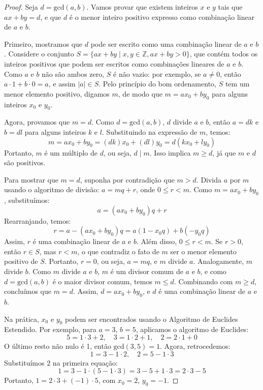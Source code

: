\begin{proof}
  Seja $d = \text{gcd}(a, b)$. Vamos provar que existem inteiros $x$ e $y$ tais
  que $ax + by = d$, e que $d$ é o menor inteiro positivo expresso como
  combinação linear de $a$ e $b$.

  Primeiro, mostramos que $d$ pode ser escrito como uma combinação linear de
  $a$ e $b$. Considere o conjunto $S = \{ ax + by \mid x, y \in \mathbb{Z}, ax + by > 0 \}$,
  que contém todos os inteiros positivos que podem ser escritos
  como combinações lineares de $a$ e $b$. Como $a$ e $b$ não são ambos zero,
  $S$ é não vazio: por exemplo, se $a \neq 0$, então $a \cdot 1 + b \cdot 0 = a$,
  e assim $|a| \in S$. Pelo princípio do bom
  ordenamento, $S$ tem um menor elemento positivo, digamos $m$, de modo que $m
  = ax_0 + by_0$ para alguns inteiros $x_0$ e $y_0$.

  Agora, provamos que $m = d$. Como $d = \text{gcd}(a, b)$, $d$ divide $a$ e
  $b$, então $a = d k$ e $b = d l$ para alguns inteiros $k$ e $l$. Substituindo
  na expressão de $m$, temos:
  \[
  m = ax_0 + by_0 = (d k) x_0 + (d l) y_0 = d (k x_0 + l y_0)
  \]
  Portanto, $m$ é um múltiplo de $d$, ou seja, $d \mid m$. Isso implica $m \geq
  d$, já que $m$ e $d$ são positivos.

  Para mostrar que $m = d$, suponha por contradição que $m > d$. Divida $a$ por
  $m$ usando o algoritmo de divisão: $a = m q + r$, onde $0 \leq r < m$. Como
  $m = ax_0 + by_0$, substituímos:
  \[
  a = (ax_0 + by_0) q + r
  \]
  Rearranjando, temos:
  \[
  r = a - (ax_0 + by_0) q = a (1 - x_0 q) + b (-y_0 q)
  \]
  Assim, $r$ é uma combinação linear de $a$ e $b$. Além disso, $0 \leq r < m$.
  Se $r > 0$, então $r \in S$, mas $r < m$, o que contradiz o fato de $m$ ser o
  menor elemento positivo de $S$. Portanto, $r = 0$, ou seja, $a = m q$, e $m$
  divide $a$. Analogamente, $m$ divide $b$. Como $m$ divide $a$ e $b$, $m$ é um
  divisor comum de $a$ e $b$, e como $d = \text{gcd}(a, b)$ é o maior divisor
  comum, temos $m \leq d$. Combinando com $m \geq d$, concluímos que $m = d$.
  Assim, $d = ax_0 + by_0$, e $d$ é uma combinação linear de $a$ e $b$.

  Na prática, $x_0$ e $y_0$ podem ser encontrados usando o Algoritmo de
  Euclides Estendido. Por exemplo, para $a = 3$, $b = 5$, aplicamos o algoritmo
  de Euclides:
  \[
  5 = 1 \cdot 3 + 2, \quad 3 = 1 \cdot 2 + 1, \quad 2 = 2 \cdot 1 + 0
  \]
  O último resto não nulo é 1, então $\text{gcd}(3, 5) = 1$. Agora, retrocedemos:
  \[
  1 = 3 - 1 \cdot 2, \quad 2 = 5 - 1 \cdot 3
  \]
   Substituímos $2$ na primeira equação:
  \[
  1 = 3 - 1 \cdot (5 - 1 \cdot 3) = 3 - 5 + 1 \cdot 3 = 2 \cdot 3 - 5
  \]
  Portanto, $1 = 2 \cdot 3 + (-1) \cdot 5$, com $x_0 = 2$, $y_0 = -1$.


\end{proof}
